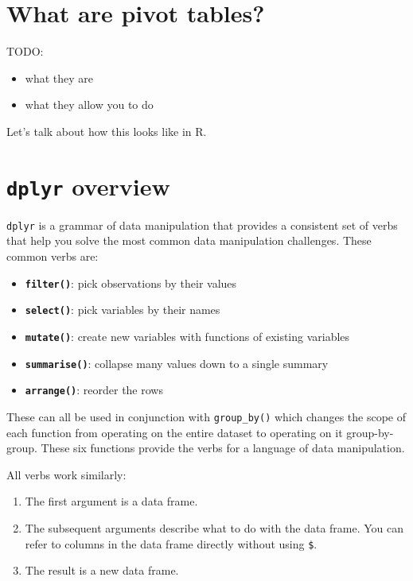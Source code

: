 \documentclass[]{book}
\providecommand{\tightlist}{%
  \setlength{\itemsep}{0pt}\setlength{\parskip}{0pt}}
\begin{document}
\hypertarget{what-are-pivot-tables}{%
\section{What are pivot tables?}\label{what-are-pivot-tables}}

TODO:

\begin{itemize}
\tightlist
\item
  what they are
\item
  what they allow you to do
\end{itemize}

Let's talk about how this looks like in R.

\hypertarget{dplyr-overview}{%
\section{\texorpdfstring{\texttt{dplyr} overview}{dplyr overview}}\label{dplyr-overview}}

\texttt{dplyr} is a grammar of data manipulation that provides a consistent set of verbs that help you solve the most common data manipulation challenges. These common verbs are:

\begin{itemize}
\item
  \textbf{\texttt{filter()}}: pick observations by their values
\item
  \textbf{\texttt{select()}}: pick variables by their names
\item
  \textbf{\texttt{mutate()}}: create new variables with functions of existing variables
\item
  \textbf{\texttt{summarise()}}: collapse many values down to a single summary
\item
  \textbf{\texttt{arrange()}}: reorder the rows
\end{itemize}

These can all be used in conjunction with \texttt{group\_by()} which changes the scope of each function from operating on the entire dataset to operating on it group-by-group. These six functions provide the verbs for a language of data manipulation.

All verbs work similarly:

\begin{enumerate}
\def\labelenumi{\arabic{enumi}.}
\tightlist
\item
  The first argument is a data frame.
\item
  The subsequent arguments describe what to do with the data frame. You can refer to columns in the data frame directly without using \texttt{\$}.
\item
  The result is a new data frame.
\end{enumerate}
\end{document}
